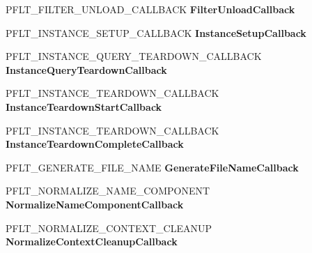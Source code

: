 \begin{DoxyCompactItemize}
P\+F\+L\+T\+\_\+\+F\+I\+L\+T\+E\+R\+\_\+\+U\+N\+L\+O\+A\+D\+\_\+\+C\+A\+L\+L\+B\+A\+CK {\bfseries Filter\+Unload\+Callback}
\item 
\mbox{\label{struct___f_l_t___r_e_g_i_s_t_r_a_t_i_o_n_a97b0b85910ea453e84664f1ed228ca99}} 
P\+F\+L\+T\+\_\+\+I\+N\+S\+T\+A\+N\+C\+E\+\_\+\+S\+E\+T\+U\+P\+\_\+\+C\+A\+L\+L\+B\+A\+CK {\bfseries Instance\+Setup\+Callback}
\item 
\mbox{\label{struct___f_l_t___r_e_g_i_s_t_r_a_t_i_o_n_a7510f5653273d00feae462f0afd1662e}} 
P\+F\+L\+T\+\_\+\+I\+N\+S\+T\+A\+N\+C\+E\+\_\+\+Q\+U\+E\+R\+Y\+\_\+\+T\+E\+A\+R\+D\+O\+W\+N\+\_\+\+C\+A\+L\+L\+B\+A\+CK {\bfseries Instance\+Query\+Teardown\+Callback}
\item 
\mbox{\label{struct___f_l_t___r_e_g_i_s_t_r_a_t_i_o_n_a102444e5eacd17f191ff90e28bef4e44}} 
P\+F\+L\+T\+\_\+\+I\+N\+S\+T\+A\+N\+C\+E\+\_\+\+T\+E\+A\+R\+D\+O\+W\+N\+\_\+\+C\+A\+L\+L\+B\+A\+CK {\bfseries Instance\+Teardown\+Start\+Callback}
\item 
\mbox{\label{struct___f_l_t___r_e_g_i_s_t_r_a_t_i_o_n_aa334e252011fa2751216f81d7ef825c1}} 
P\+F\+L\+T\+\_\+\+I\+N\+S\+T\+A\+N\+C\+E\+\_\+\+T\+E\+A\+R\+D\+O\+W\+N\+\_\+\+C\+A\+L\+L\+B\+A\+CK {\bfseries Instance\+Teardown\+Complete\+Callback}
\item 
\mbox{\label{struct___f_l_t___r_e_g_i_s_t_r_a_t_i_o_n_a95cc71063af5d6c5961d6207cdf1ee1e}} 
P\+F\+L\+T\+\_\+\+G\+E\+N\+E\+R\+A\+T\+E\+\_\+\+F\+I\+L\+E\+\_\+\+N\+A\+ME {\bfseries Generate\+File\+Name\+Callback}
\item 
\mbox{\label{struct___f_l_t___r_e_g_i_s_t_r_a_t_i_o_n_a5a5533c7f66772da3c3b4293ac4f5747}} 
P\+F\+L\+T\+\_\+\+N\+O\+R\+M\+A\+L\+I\+Z\+E\+\_\+\+N\+A\+M\+E\+\_\+\+C\+O\+M\+P\+O\+N\+E\+NT {\bfseries Normalize\+Name\+Component\+Callback}
\item 
\mbox{\label{struct___f_l_t___r_e_g_i_s_t_r_a_t_i_o_n_a90feeabd1ada75c33eb1eb3af75d7dc8}} 
P\+F\+L\+T\+\_\+\+N\+O\+R\+M\+A\+L\+I\+Z\+E\+\_\+\+C\+O\+N\+T\+E\+X\+T\+\_\+\+C\+L\+E\+A\+N\+UP {\bfseries Normalize\+Context\+Cleanup\+Callback}

\end{DoxyCompactItemize}
